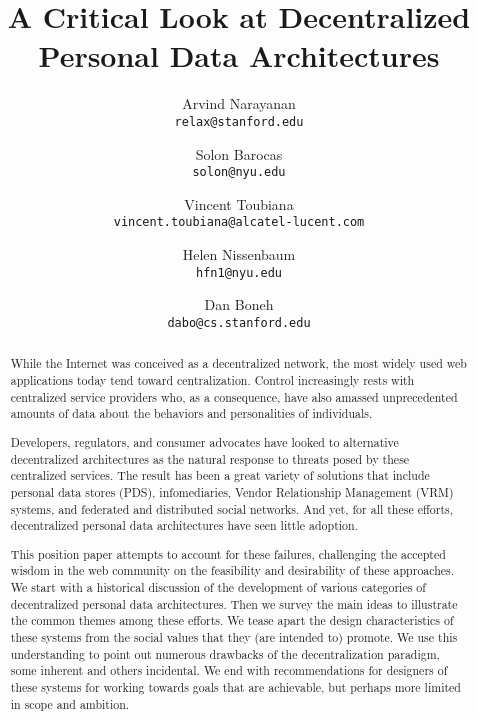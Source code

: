 \documentclass{acm_proc_article-sp}
\begin{document}
\title{A Critical Look at Decentralized Personal Data Architectures}





	\author{
		Arvind Narayanan \\
			{\small \texttt{relax@stanford.edu}}	
		\and
			Solon Barocas\\
			{\small \texttt{solon@nyu.edu}}
		\and
			Vincent Toubiana\\
		{\small \texttt{vincent.toubiana@alcatel-lucent.com}}
		\and
			Helen Nissenbaum \\
			{\small \texttt{hfn1@nyu.edu}}
		\and
			Dan Boneh \\
			{\small \texttt{dabo@cs.stanford.edu}} 
	}
\makeatletter
\def\@copyrightspace{}
\g@addto@macro\@maketitle{
\vspace{-20pt}
\begin{center}
\aufnt\@date
\end{center}
\vspace{20pt}
}
\makeatother
\maketitle
\begin{abstract}

While the Internet was conceived as a decentralized network, the most widely used web applications today tend toward centralization. Control increasingly rests with centralized service providers who, as a consequence, have also amassed unprecedented amounts of data about the behaviors and personalities of individuals.

Developers, regulators, and consumer advocates have looked to alternative decentralized architectures as the natural response to threats posed by these centralized services.  The result has been a great variety of solutions that include personal data stores (PDS), infomediaries, Vendor Relationship Management (VRM) systems, and federated and distributed social networks.  And yet, for all these efforts, decentralized personal data architectures have seen little adoption.

This position paper attempts to account for these failures, challenging the accepted wisdom in the web community on the feasibility and desirability of these approaches. We start with a historical discussion of the development of various categories of decentralized personal data architectures. Then we survey the main ideas to illustrate the common themes among these efforts. We tease apart the design characteristics of these systems from the social values that they (are intended to) promote. We use this understanding to point out numerous drawbacks of the decentralization paradigm, some inherent and others incidental. We end with recommendations for designers of these systems for working towards goals that are achievable, but perhaps more limited in scope and ambition.

\end{abstract}
\end{document}
